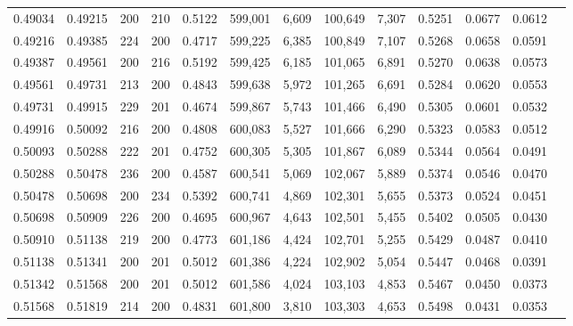 \begin{tabular}{rrrrrrrrrrrrr}
0.49034 & 0.49215 &   200 & 210 &                                     0.5122 & 599,001 &   6,609 & 100,649 &   7,307 & 0.5251 & 0.0677 & 0.0612 \\
0.49216 & 0.49385 &   224 & 200 &                                     0.4717 & 599,225 &   6,385 & 100,849 &   7,107 & 0.5268 & 0.0658 & 0.0591 \\
0.49387 & 0.49561 &   200 & 216 &                                     0.5192 & 599,425 &   6,185 & 101,065 &   6,891 & 0.5270 & 0.0638 & 0.0573 \\
0.49561 & 0.49731 &   213 & 200 &                                     0.4843 & 599,638 &   5,972 & 101,265 &   6,691 & 0.5284 & 0.0620 & 0.0553 \\
0.49731 & 0.49915 &   229 & 201 &                                     0.4674 & 599,867 &   5,743 & 101,466 &   6,490 & 0.5305 & 0.0601 & 0.0532 \\
0.49916 & 0.50092 &   216 & 200 &                                     0.4808 & 600,083 &   5,527 & 101,666 &   6,290 & 0.5323 & 0.0583 & 0.0512 \\
0.50093 & 0.50288 &   222 & 201 &                                     0.4752 & 600,305 &   5,305 & 101,867 &   6,089 & 0.5344 & 0.0564 & 0.0491 \\
0.50288 & 0.50478 &   236 & 200 &                                     0.4587 & 600,541 &   5,069 & 102,067 &   5,889 & 0.5374 & 0.0546 & 0.0470 \\
0.50478 & 0.50698 &   200 & 234 &                                     0.5392 & 600,741 &   4,869 & 102,301 &   5,655 & 0.5373 & 0.0524 & 0.0451 \\
0.50698 & 0.50909 &   226 & 200 &                                     0.4695 & 600,967 &   4,643 & 102,501 &   5,455 & 0.5402 & 0.0505 & 0.0430 \\
0.50910 & 0.51138 &   219 & 200 &                                     0.4773 & 601,186 &   4,424 & 102,701 &   5,255 & 0.5429 & 0.0487 & 0.0410 \\
0.51138 & 0.51341 &   200 & 201 &                                     0.5012 & 601,386 &   4,224 & 102,902 &   5,054 & 0.5447 & 0.0468 & 0.0391 \\
0.51342 & 0.51568 &   200 & 201 &                                     0.5012 & 601,586 &   4,024 & 103,103 &   4,853 & 0.5467 & 0.0450 & 0.0373 \\
0.51568 & 0.51819 &   214 & 200 &                                     0.4831 & 601,800 &   3,810 & 103,303 &   4,653 & 0.5498 & 0.0431 & 0.0353 \\

\end{tabular}
